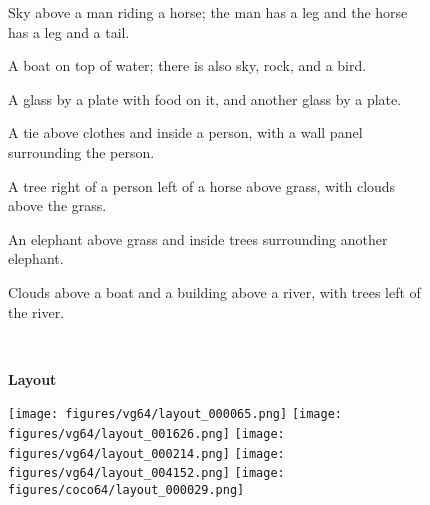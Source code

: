 \documentclass[10pt,twocolumn,letterpaper]{article}
\begin{document}
\begin{figure*}[ht!]
  \hspace{\qualtextspace}
  \begin{minipage}{\qualtext}
    \ssmall
    Sky above a man riding a horse; the man has a leg and the horse
    has a leg and a tail.
  \end{minipage}
  \hspace{\qualtextspace}
  \begin{minipage}{\qualtext}
    \ssmall
    A boat on top of water; there is also sky, rock, and a bird.
  \end{minipage}
  \hspace{\qualtextspace}
  \begin{minipage}{\qualtext}
    \ssmall
    A glass by a plate with food on it, and another glass by a plate.
  \end{minipage}
  \hspace{\qualtextspace}
  \begin{minipage}{\qualtext}
    \ssmall
    A tie above clothes and inside a person, with a wall panel surrounding
    the person.
  \end{minipage}
  \hspace{\qualtextspace}
  \begin{minipage}{\qualtext}
    \ssmall
    A tree right of a person left of a horse above grass, with clouds
    above the grass.
  \end{minipage}
  \hspace{\qualtextspace}
  \begin{minipage}{\qualtext}
    \ssmall
    An elephant above grass and inside trees surrounding another elephant.
  \end{minipage}
  \hspace{\qualtextspace}
  \begin{minipage}{\qualtext}
    \ssmall
    Clouds above a boat and a building above a river, with trees left of
    the river.
  \end{minipage} \\
  \begin{rotate}{90}
    \hspace{4mm}
    \textbf{Layout}
  \end{rotate}
  \hspace*{0.5mm}
  \texttt{[image: figures/vg64/layout\_000065.png]}
  \texttt{[image: figures/vg64/layout\_001626.png]}
  \texttt{[image: figures/vg64/layout\_000214.png]}
  \texttt{[image: figures/vg64/layout\_004152.png]}
  \texttt{[image: figures/coco64/layout\_000029.png]}

\end{figure*}
\end{document}
